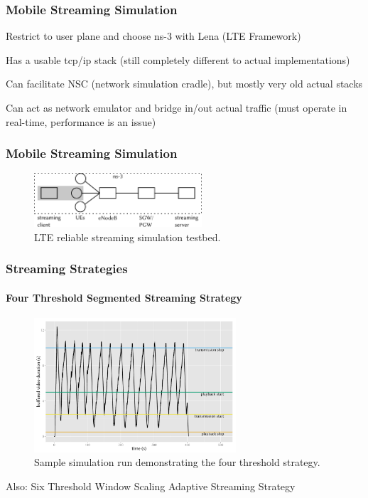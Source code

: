 \documentclass{beamer}
\begin{document}
\begin{frame}
	\frametitle{Mobile Streaming Simulation}

	Restrict to user plane and choose ns-3 with Lena (LTE Framework)

	Has a usable tcp/ip stack (still completely different to actual implementations)

	Can facilitate NSC (network simulation cradle), but mostly very old actual stacks

	Can act as network emulator and bridge in/out actual traffic (must operate in real-time, performance is an issue)
\end{frame}


\begin{frame}
	\frametitle{Mobile Streaming Simulation}

	\begin{figure}
		\includegraphics[height=2cm]{../../chapters/06-mobilestreamingmeasurements/images/streaming-simulation.pdf}
		\caption{LTE reliable streaming simulation testbed.}
	\end{figure}
\end{frame}


\begin{frame}
	\frametitle{Streaming Strategies}
	\framesubtitle{Four Threshold Segmented Streaming Strategy}

	\begin{figure}
		\includegraphics[height=5cm]{../../chapters/06-mobilestreamingmeasurements/images/R-ltesim-plotbuffer-time.pdf}
		\caption{Sample simulation run demonstrating the four threshold strategy.}
	\end{figure}

	Also: Six Threshold Window Scaling Adaptive Streaming Strategy

\end{frame}
\end{document}
